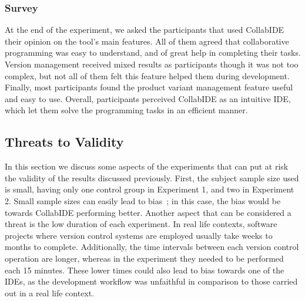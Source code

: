 \subsubsection{Survey}
At the end of the experiment, we asked the participants that used CollabIDE their opinion on the tool's 
main features. All of them agreed that collaborative programming was easy to understand, and of great 
help in completing their tasks. Version management received mixed results as participants though it 
was not too complex, but not all of them felt this feature helped them during development. Finally, most participants found the product variant management feature useful and easy to use. Overall, 
participants perceived CollabIDE as an intuitive IDE, which let them solve the programming tasks in an 
efficient manner. 

\subsection{Threats to Validity}
In this section we discuss some aspects of the experiments that can put at risk the validity of the 
results discussed previously. First, the subject sample size used is small, having only one control group 
in Experiment 1, and two in Experiment 2. Small sample sizes can easily lead to 
bias~\cite{threatstoval}; in this case, the bias would be towards CollabIDE performing better. Another 
aspect that can be considered a threat is the low duration of each experiment. In real life contexts, 
software projects where version control systems are employed usually take weeks to months to 
complete. Additionally, the time intervals between each version control operation are longer, whereas 
in the experiment they needed to be performed each 15 minutes. These lower times could also lead to 
bias towards one of the IDEs, as the development workflow was unfaithful in comparison to those 
carried out in a real life context. 


\endinput
